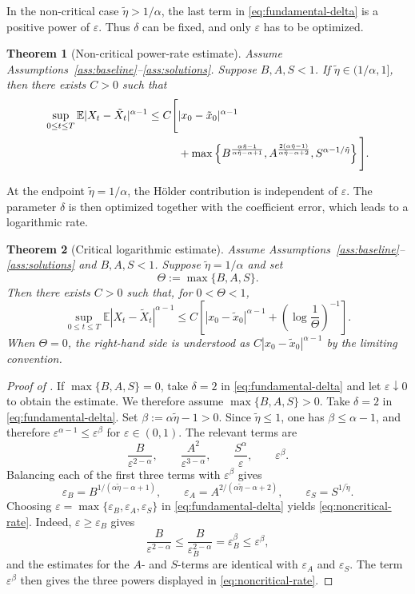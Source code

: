 \documentclass[10pt,a4paper]{amsart}
\newtheorem{theorem}{Theorem}[section]
\newcommand{\E}{\mathbb{E}}
\newcommand{\1}{\mathbf{1}}
\newcommand{\wt}{\tilde}
\newcommand{\eps}{\varepsilon}
\begin{document}
In the non-critical case $\wt\eta>1/\alpha$, the last term in \eqref{eq:fundamental-delta} is a positive power of $\eps$. Thus $\delta$ can be fixed, and only $\eps$ has to be optimized.

\begin{theorem}[Non-critical power-rate estimate]\label{thm:noncritical}
Assume Assumptions~\ref{ass:baseline}--\ref{ass:solutions}. Suppose $B,A,S<1$.
If $\wt\eta\in(1/\alpha,1]$, then there exists $C>0$ such that
\begin{align}
\sup_{0\le t\le T}\E|X_t-\wt X_t|^{\alpha-1}
\le C\Bigg[&|x_0-\wt x_0|^{\alpha-1} \notag\\
&+\max\left\{
B^{\frac{\alpha\wt\eta-1}{\alpha\wt\eta-\alpha+1}},
A^{\frac{2(\alpha\wt\eta-1)}{\alpha\wt\eta-\alpha+2}},
S^{\alpha-1/\wt\eta}
\right\}\Bigg]. \label{eq:noncritical-rate}
\end{align}
\end{theorem}

At the endpoint $\wt\eta=1/\alpha$, the H\"older contribution is independent of $\eps$. The parameter $\delta$ is then optimized together with the coefficient error, which leads to a logarithmic rate.

\begin{theorem}[Critical logarithmic estimate]\label{thm:critical}
Assume Assumptions~\ref{ass:baseline}--\ref{ass:solutions} and $B,A,S<1$. Suppose $\wt\eta=1/\alpha$ and set
\[
  \Theta:=\max\{B,A,S\}.
\]
Then there exists $C>0$ such that, for $0<\Theta<1$,
\begin{equation}\label{eq:critical-rate}
\sup_{0\le t\le T}\E|X_t-\wt X_t|^{\alpha-1}
\le C\left[|x_0-\wt x_0|^{\alpha-1}+\left(\log\frac1\Theta\right)^{-1}\right].
\end{equation}
When $\Theta=0$, the right-hand side is understood as $C|x_0-\wt x_0|^{\alpha-1}$ by the limiting convention.
\end{theorem}

\begin{proof}[Proof of ]
If $\max\{B,A,S\}=0$, take $\delta=2$ in \eqref{eq:fundamental-delta} and let $\eps\downarrow0$ to obtain the estimate. We therefore assume $\max\{B,A,S\}>0$. Take $\delta=2$ in \eqref{eq:fundamental-delta}. Set $\beta:=\alpha\wt\eta-1>0$. Since $\wt\eta\le1$, one has $\beta\le\alpha-1$, and therefore $\eps^{\alpha-1}\le\eps^\beta$ for $\eps\in(0,1)$. The relevant terms are
\[
  \frac{B}{\eps^{2-\alpha}},\qquad
  \frac{A^2}{\eps^{3-\alpha}},\qquad
  \frac{S^\alpha}{\eps},\qquad
  \eps^\beta.
\]
Balancing each of the first three terms with $\eps^\beta$ gives
\[
  \eps_B=B^{1/(\alpha\wt\eta-\alpha+1)},\qquad
  \eps_A=A^{2/(\alpha\wt\eta-\alpha+2)},\qquad
  \eps_S=S^{1/\wt\eta}.
\]
Choosing $\eps=\max\{\eps_B,\eps_A,\eps_S\}$ in \eqref{eq:fundamental-delta} yields \eqref{eq:noncritical-rate}. Indeed, $\eps\ge\eps_B$ gives
\[
  \frac{B}{\eps^{2-\alpha}}\le \frac{B}{\eps_B^{2-\alpha}}=\eps_B^\beta\le \eps^\beta,
\]
and the estimates for the $A$- and $S$-terms are identical with $\eps_A$ and $\eps_S$. The term $\eps^\beta$ then gives the three powers displayed in \eqref{eq:noncritical-rate}.
\end{proof}
\end{document}

